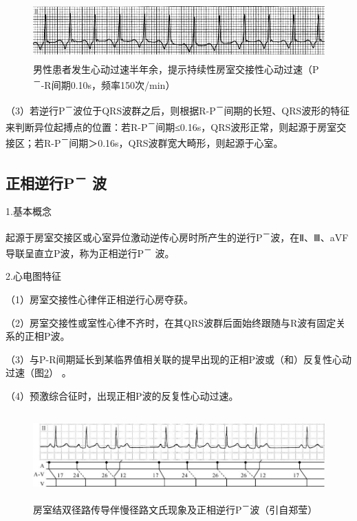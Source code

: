 \begin{figure}[!htbp]
 \centering
 \includegraphics[width=5.30208in,height=0.88542in]{./images/Image00029.jpg}
 \captionsetup{justification=centering}
 \caption{男性患者发生心动过速半年余，提示持续性房室交接性心动过速（P\textsuperscript{－}-R间期0.10s，频率150次/min）}
 \label{fig1-23}
  \end{figure} 


（3）若逆行P\textsuperscript{－}波位于QRS波群之后，则根据R-P\textsuperscript{－}间期的长短、QRS波形的特征来判断异位起搏点的位置：若R-P\textsuperscript{－}间期≤0.16s，QRS波形正常，则起源于房室交接区；若R-P\textsuperscript{－}间期＞0.16s，QRS波群宽大畸形，则起源于心室。

\protect\hypertarget{text00007.htmlux5cux23subid21}{}{}

\subsection{正相逆行P\textsuperscript{－} 波}

1.基本概念

起源于房室交接区或心室异位激动逆传心房时所产生的逆行P\textsuperscript{－}波，在Ⅱ、Ⅲ、aVF导联呈直立P波，称为正相逆行P\textsuperscript{－} 波。

2.心电图特征

（1）房室交接性心律伴正相逆行心房夺获。

（2）房室交接性或室性心律不齐时，在其QRS波群后面始终跟随与R波有固定关系的正相P波。

（3）与P-R间期延长到某临界值相关联的提早出现的正相P波或（和）反复性心动过速（图\ref{fig1-24}）
。

（4）预激综合征时，出现正相P波的反复性心动过速。

\begin{figure}[!htbp]
 \centering
 \includegraphics[width=5.88542in,height=1.28125in]{./images/Image00030.jpg}
 \captionsetup{justification=centering}
 \caption{房室结双径路传导伴慢径路文氏现象及正相逆行P\textsuperscript{－}波（引自郑莹）}
 \label{fig1-24}
  \end{figure} 


